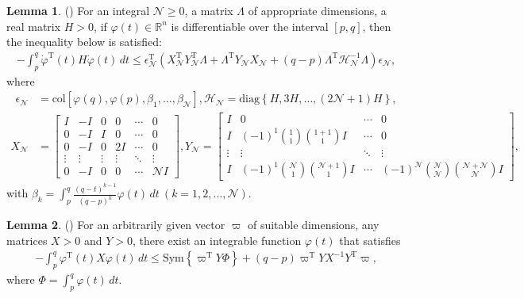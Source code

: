 \documentclass[preprint,review,fleqn,sort&compress,3p]{elsarticle}
\theoremstyle{definition}%
\newtheorem{Lem}{Lemma}[section]
\begin{document}
	\begin{Lem}\label{lem1}
		(\cite{song2021gainscheduled}) For an integral $ \mathcal{N} \geq 0 $, a matrix $\Lambda $ of appropriate dimensions, a real matrix $ H > 0 $, if $ \varphi(t) \in \mathbb{R}^n $ is differentiable over the interval $[p, q]$, then the inequality below is satisfied:
		\begin{align*}
			- \int_p^q \dot{\varphi}^\text{T}(t) H \dot{\varphi}(t) \, dt \leq \epsilon_\mathcal{N}^\text{T} \left( X_\mathcal{N}^\text{T} Y_\mathcal{N}^\text{T} \Lambda + \Lambda^\text{T} Y_\mathcal{N} X_\mathcal{N} + (q - p) \Lambda^\text{T} \mathcal{H}_\mathcal{N}^{-1} \Lambda \right) \epsilon_\mathcal{N},
		\end{align*}
		where
		\begin{align*}
			\epsilon_\mathcal{N} &= \text{col}\left[\varphi(q), \varphi(p), \beta_1, \dots, \beta_\mathcal{N}\right], 
			\mathcal{H}_\mathcal{N} = \text{diag}\left\{H, 3H, \dots, (2\mathcal{N}+1)H\right\},
		\end{align*}
		\begin{align*}
			X_\mathcal{N} &= \begin{bmatrix} 
				I & -I & 0 & 0 & \cdots & 0 \\
				0 & -I & I & 0 & \cdots & 0 \\
				0 & -I & 0 & 2I & \cdots & 0 \\
				\vdots & \vdots & \vdots & \vdots & \ddots & \vdots \\
				0 & -I & 0 & 0 & \cdots & \mathcal{N}I
			\end{bmatrix},
			Y_\mathcal{N} = \begin{bmatrix}
				I & 0 & \cdots & 0 \\
				I & (-1)^1 \binom{1}{1}\binom{1+1}{1}I & \cdots & 0 \\
				\vdots & \vdots & \ddots & \vdots \\
				I & (-1)^1 \binom{\mathcal{N}}{1}\binom{\mathcal{N}+1}{1}I & \cdots & (-1)^\mathcal{N} \binom{\mathcal{N}}{\mathcal{N}} \binom{\mathcal{N}+\mathcal{N}}{\mathcal{N}}I
			\end{bmatrix},
		\end{align*}
		with $\beta_k = \int_p^q \frac{(q - t)^{k-1}}{(q - p)^k} \varphi(t) \, dt \ (k = 1, 2, \dots, \mathcal{N})$.
	\end{Lem}
	\begin{Lem}\label{lem2}
		(\cite{wang2024synchronization}) For an arbitrarily given vector $ \varpi $ of suitable dimensions, any matrices $ X > 0 $ and $ Y > 0 $, there exist an integrable function $ \varphi(t) $ that satisfies
		\begin{align*} 	
			- \int_p^q \varphi^\text{T}(t) X \varphi(t) \, dt \leq \text{Sym} \left\{ \varpi^\text{T} Y \Phi \right\} + (q - p) \varpi^\text{T} Y X^{-1} Y^\text{T} \varpi,
		\end{align*}
		where $ \Phi = \int_p^q \varphi(t) \, dt $.
	\end{Lem}
\end{document}
